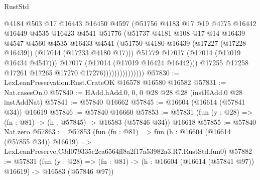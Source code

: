 \begin{lexlean}{RustStd}
\begin{coremodule}
                                  @4184
                                  @503
                                  @17
                                  @16443
                                  @16450
                                  @4597
                                  (@51756
                                    @4183
                                    @17
                                    @19
                                    @4775
                                    @16442
                                    @16449
                                    @4535
                                    @16423
                                    @4541
                                    @51776
                                    (@51737
                                      @4181
                                      @108
                                      @17
                                      @14
                                      @16439
                                      @4547
                                      @4560
                                      @4535
                                      @16433
                                      @4541
                                      (@51750
                                        @4180
                                        @16439
                                        (@17227 (@17228 @16439))
                                        (@17014 (@17233 @4180 @17)))
                                      @51779
                                      @17017
                                      (@17014 (@17019 @16434 @4547)))
                                    @17017
                                    (@17014 (@17019 @16424 @16442)))
                                  @17255
                                  @17258
                                  @17261
                                  @17265
                                  @17270
                                  @17276)))))))))))))))
@57830 := LexLeanPreservation.Rust.CrateOK @16578 @16580 @16582
@57831 := Nat.casesOn.{0}
@57840 := HAdd.hAdd.{0, 0, 0} @28 @28 @28 (instHAdd.{0} @28 instAddNat)
@57841 := @57840 @16662
@57845 := @16604 (@16614 (@57841 @34)) @16619
@57846 := @57840 @16660
@57853 := @57831 (fun (y : @28) => (fn : @81) -> (h : @57845) -> @16583 (@57846 @34)) @16618
@57855 := @57840 Nat.zero
@57863 := @57853
    (fun (fn : @81) =>
    fun (h : @16604 (@16614 (@57855 @34)) @16619) =>
    LexLeanPreserve.C3d079335c2ca6564ff8a2f17a53982a3.R7.RustStd.fun0)
@57882 := @57831
    (fun (y : @28) =>
    (fn : @81) -> (h : @16604 (@16614 (@57841 @97)) @16619) -> @16583 (@57846 @97))

\end{coremodule}
\end{lexlean}
